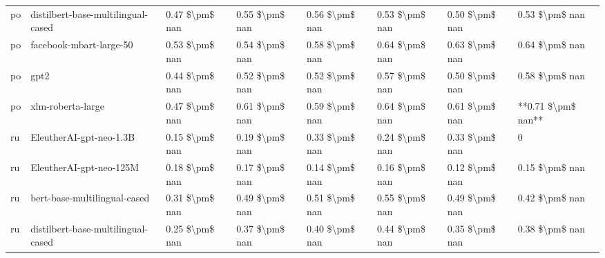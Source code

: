 \begin{tabular}{llllllll}
      po & distilbert-base-multilingual-cased & 0.47 \$\textbackslash pm\$ nan &            0.55 \$\textbackslash pm\$ nan &        0.56 \$\textbackslash pm\$ nan &         0.53 \$\textbackslash pm\$ nan &                          0.50 \$\textbackslash pm\$ nan &     0.53 \$\textbackslash pm\$ nan \\
      po &            facebook-mbart-large-50 & 0.53 \$\textbackslash pm\$ nan &            0.54 \$\textbackslash pm\$ nan &        0.58 \$\textbackslash pm\$ nan &         0.64 \$\textbackslash pm\$ nan &                          0.63 \$\textbackslash pm\$ nan &     0.64 \$\textbackslash pm\$ nan \\
      po &                               gpt2 & 0.44 \$\textbackslash pm\$ nan &            0.52 \$\textbackslash pm\$ nan &        0.52 \$\textbackslash pm\$ nan &         0.57 \$\textbackslash pm\$ nan &                          0.50 \$\textbackslash pm\$ nan &     0.58 \$\textbackslash pm\$ nan \\
      po &                  xlm-roberta-large & 0.47 \$\textbackslash pm\$ nan &            0.61 \$\textbackslash pm\$ nan &        0.59 \$\textbackslash pm\$ nan &         0.64 \$\textbackslash pm\$ nan &                          0.61 \$\textbackslash pm\$ nan & **0.71 \$\textbackslash pm\$ nan** \\
      ru &            EleutherAI-gpt-neo-1.3B & 0.15 \$\textbackslash pm\$ nan &            0.19 \$\textbackslash pm\$ nan &        0.33 \$\textbackslash pm\$ nan &         0.24 \$\textbackslash pm\$ nan &                          0.33 \$\textbackslash pm\$ nan &                  0 \\
      ru &            EleutherAI-gpt-neo-125M & 0.18 \$\textbackslash pm\$ nan &            0.17 \$\textbackslash pm\$ nan &        0.14 \$\textbackslash pm\$ nan &         0.16 \$\textbackslash pm\$ nan &                          0.12 \$\textbackslash pm\$ nan &     0.15 \$\textbackslash pm\$ nan \\
      ru &       bert-base-multilingual-cased & 0.31 \$\textbackslash pm\$ nan &            0.49 \$\textbackslash pm\$ nan &        0.51 \$\textbackslash pm\$ nan &         0.55 \$\textbackslash pm\$ nan &                          0.49 \$\textbackslash pm\$ nan &     0.42 \$\textbackslash pm\$ nan \\
      ru & distilbert-base-multilingual-cased & 0.25 \$\textbackslash pm\$ nan &            0.37 \$\textbackslash pm\$ nan &        0.40 \$\textbackslash pm\$ nan &         0.44 \$\textbackslash pm\$ nan &                          0.35 \$\textbackslash pm\$ nan &     0.38 \$\textbackslash pm\$ nan \\

\end{tabular}
